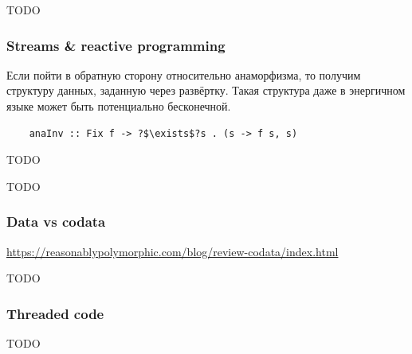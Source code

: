 
TODO %

\subsubsection{Streams \& reactive programming}

Если пойти в обратную сторону относительно анаморфизма, то получим структуру данных, заданную через развёртку.
Такая структура даже в энергичном языке может быть потенциально бесконечной.
\begin{verbatim}
    anaInv :: Fix f -> ?$\exists$?s . (s -> f s, s)
\end{verbatim}

TODO\cite{coutts2007stream, kiselyov2022highest} %






TODO %

\subsubsection{Data vs codata}

\url{https://reasonablypolymorphic.com/blog/review-codata/index.html}



TODO~\cite{downen2019codata} %

\subsubsection{Threaded code}

TODO %

